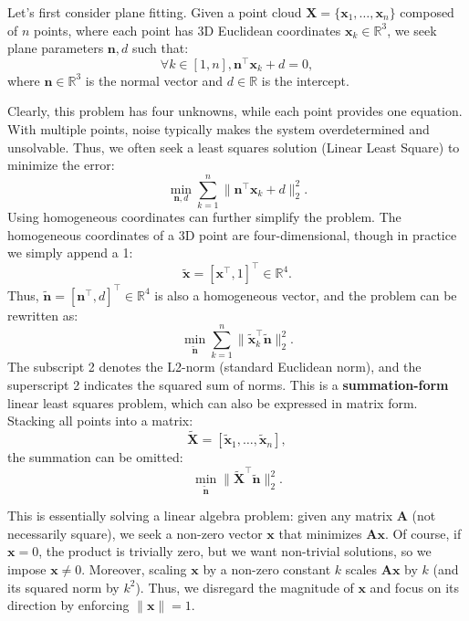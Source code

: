 Let's first consider plane fitting. Given a point cloud $\bm{X} = \{ \bm{x}_1, \ldots, \bm{x}_n \}$ composed of $n$ points, where each point has 3D Euclidean coordinates $\bm{x}_k \in \mathbb{R}^3$, we seek plane parameters $\bm{n}, d$ such that:
\begin{equation}
	\forall k \in [1, n], \bm{n}^\top \bm{x}_k + d = 0,
\end{equation}
where $\bm{n} \in \mathbb{R}^3$ is the normal vector and $d \in \mathbb{R}$ is the intercept.

Clearly, this problem has four unknowns, while each point provides one equation. With multiple points, noise typically makes the system overdetermined and unsolvable. Thus, we often seek a least squares solution (Linear Least Square) to minimize the error:
\begin{equation}
	\min_{\bm{n}, d} \sum_{k=1}^{n} \| \bm{n}^\top \bm{x}_k + d \|_2^2.
\end{equation}
Using homogeneous coordinates can further simplify the problem. The homogeneous coordinates of a 3D point are four-dimensional, though in practice we simply append a 1:
\begin{equation}
	\tilde{\bm{x}} = [\bm{x}^\top, 1]^\top \in \mathbb{R}^4.
\end{equation}
Thus, $\tilde{\bm{n}} = [\bm{n}^\top, d]^\top \in \mathbb{R}^4$ is also a homogeneous vector, and the problem can be rewritten as:
\begin{equation}\label{eq.6.6}
	\min_{\tilde{\bm{n}}} \sum_{k=1}^{n} \| \tilde{\bm{x}}^\top_k \tilde{\bm{n}} \|_2^2.
\end{equation}
The subscript 2 denotes the L2-norm (standard Euclidean norm), and the superscript 2 indicates the squared sum of norms. This is a \textbf{summation-form} linear least squares problem, which can also be expressed in matrix form. Stacking all points into a matrix:
\begin{equation}
	\tilde{\bm{X}} = [\tilde{\bm{x}}_1, \ldots, \tilde{\bm{x}}_n],
\end{equation}
the summation can be omitted:
\begin{equation}
	\min_{\tilde{\bm{n}}} \| \tilde{\bm{X}}^\top \tilde{\bm{n}} \|_2^2.
\end{equation}

This is essentially solving a linear algebra problem: given any matrix $\bm{A}$ (not necessarily square), we seek a non-zero vector $\bm{x}$ that minimizes $\bm{A} \bm{x}$. Of course, if $\bm{x} = 0$, the product is trivially zero, but we want non-trivial solutions, so we impose $\bm{x} \neq 0$. Moreover, scaling $\bm{x}$ by a non-zero constant $k$ scales $\bm{A}\bm{x}$ by $k$ (and its squared norm by $k^2$). Thus, we disregard the magnitude of $\bm{x}$ and focus on its direction by enforcing $\|\bm{x}\|=1$.

